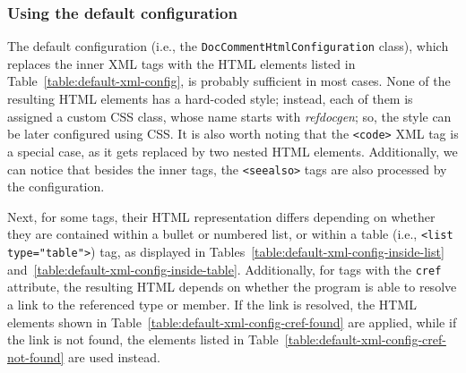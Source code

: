\subsubsection{Using the default configuration}
\label{sec:extensibility-default-config}

The default configuration (i.e., the \texttt{DocCommentHtmlConfiguration} class), which replaces the inner XML tags with the HTML elements listed in Table~\ref{table:default-xml-config}, is probably sufficient in most cases.
None of the resulting HTML elements has a hard-coded style; instead, each of them is assigned a custom CSS class, whose name starts with \textit{refdocgen}; so, the style can be later configured using CSS.
It is also worth noting that the \texttt{<code>} XML tag is a special case, as it gets replaced by two nested HTML elements.
Additionally, we can notice that besides the inner tags, the \texttt{<seealso>} tags are also processed by the configuration.

Next, for some tags, their HTML representation differs depending on whether they are contained within a bullet or numbered list, or within a table (i.e., \texttt{<list type="table">}) tag, as displayed in Tables~\ref{table:default-xml-config-inside-list} and~\ref{table:default-xml-config-inside-table}.
Additionally, for tags with the \texttt{cref} attribute, the resulting HTML depends on whether the program is able to resolve a link to the referenced type or member.
If the link is resolved, the HTML elements shown in Table~\ref{table:default-xml-config-cref-found} are applied, while if the link is not found, the elements listed in Table~\ref{table:default-xml-config-cref-not-found} are used instead.

